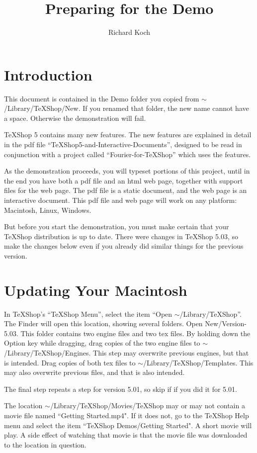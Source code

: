 \documentclass[11pt, oneside]{article}   	%
\title{Preparing for the Demo}
\author{Richard Koch}
\begin{document}
\maketitle

\section{Introduction}

This document is contained in the Demo folder you copied from $\sim$/Library/TeXShop/New. If you renamed that folder, the new name cannot have a space. Otherwise the demonstration will fail.

TeXShop 5 contains many new features. The new features are explained in detail in the pdf file ``TeXShop5-and-Interactive-Documents'', designed to be read in conjunction with a project called ``Fourier-for-TeXShop'' which uses the features.

As the demonstration proceeds, you will typeset portions of this project, until in the end you have both a pdf file and an html web page, together with support files for the web page. The pdf file is a static document, and the web page is an interactive document.  This pdf file and web page will work on any platform: Macintosh, Linux, Windows. 

But before you start the demonstration, you must make certain that your TeXShop distribution is up to date. There were changes in TeXShop 5.03, so make the changes below even if you already did similar things for the previous version.

\section{Updating Your Macintosh}

In TeXShop's ``TeXShop Menu'', select the item ``Open $\sim$/Library/TeXShop''. The Finder will open this location, showing several folders.  Open New/Version-5.03. This folder contains two engine files and two tex files. By holding down the Option key while dragging, drag copies of the two engine files to $\sim$/Library/TeXShop/Engines. This step may overwrite previous engines, but that is intended. Drag copies of both tex files to
$\sim$/Library/TeXShop/Templates. This may also overwrite previous files, and that is also intended.

The final step repeats a step for version 5.01, so skip if if you did it for 5.01.

The location $\sim$/Library/TeXShop/Movies/TeXShop may or may not contain a movie file named ``Getting Started.mp4". If it does not, go to the TeXShop Help menu and select the item ``TeXShop Demos/Getting Started". A short movie will play. A side effect of watching that movie is that the movie file was downloaded to the location in question.
\end{document}

